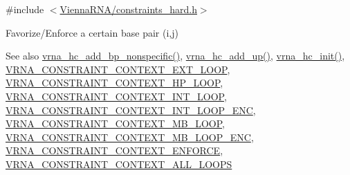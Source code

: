 {\ttfamily \#include $<$\hyperlink{constraints__hard_8h}{Vienna\+R\+N\+A/constraints\+\_\+hard.\+h}$>$}



Favorize/\+Enforce a certain base pair (i,j) 

\begin{DoxySeeAlso}{See also}
\hyperlink{group__hard__constraints_gadeb1083d0dc928e1e931065aae54ad82}{vrna\+\_\+hc\+\_\+add\+\_\+bp\+\_\+nonspecific()}, \hyperlink{group__hard__constraints_gaeb352e3e6ccd2b567bafa451365bb545}{vrna\+\_\+hc\+\_\+add\+\_\+up()}, \hyperlink{group__hard__constraints_ga36ff456c43bf920629cee5a236e4f0ff}{vrna\+\_\+hc\+\_\+init()}, \hyperlink{group__hard__constraints_ga9418eda62a5dec070896702c279d2548}{V\+R\+N\+A\+\_\+\+C\+O\+N\+S\+T\+R\+A\+I\+N\+T\+\_\+\+C\+O\+N\+T\+E\+X\+T\+\_\+\+E\+X\+T\+\_\+\+L\+O\+OP}, \hyperlink{group__hard__constraints_ga79203702b197b6b9d3b78eed40663eb1}{V\+R\+N\+A\+\_\+\+C\+O\+N\+S\+T\+R\+A\+I\+N\+T\+\_\+\+C\+O\+N\+T\+E\+X\+T\+\_\+\+H\+P\+\_\+\+L\+O\+OP}, \hyperlink{group__hard__constraints_ga21feeab3a9e5fa5a9e3d9ac0fcf5994f}{V\+R\+N\+A\+\_\+\+C\+O\+N\+S\+T\+R\+A\+I\+N\+T\+\_\+\+C\+O\+N\+T\+E\+X\+T\+\_\+\+I\+N\+T\+\_\+\+L\+O\+OP}, \hyperlink{group__hard__constraints_ga0536288e04ff6332ecdc23ca4705402b}{V\+R\+N\+A\+\_\+\+C\+O\+N\+S\+T\+R\+A\+I\+N\+T\+\_\+\+C\+O\+N\+T\+E\+X\+T\+\_\+\+I\+N\+T\+\_\+\+L\+O\+O\+P\+\_\+\+E\+NC}, \hyperlink{group__hard__constraints_ga456ecd2ff00056bb64da8dd4f61bbfc5}{V\+R\+N\+A\+\_\+\+C\+O\+N\+S\+T\+R\+A\+I\+N\+T\+\_\+\+C\+O\+N\+T\+E\+X\+T\+\_\+\+M\+B\+\_\+\+L\+O\+OP}, \hyperlink{group__hard__constraints_ga02a3d703ddbcfce393e4bbfcb9db7077}{V\+R\+N\+A\+\_\+\+C\+O\+N\+S\+T\+R\+A\+I\+N\+T\+\_\+\+C\+O\+N\+T\+E\+X\+T\+\_\+\+M\+B\+\_\+\+L\+O\+O\+P\+\_\+\+E\+NC}, \hyperlink{constraints__hard_8h_a1aa55f2c6347e670e003b1a765632dad}{V\+R\+N\+A\+\_\+\+C\+O\+N\+S\+T\+R\+A\+I\+N\+T\+\_\+\+C\+O\+N\+T\+E\+X\+T\+\_\+\+E\+N\+F\+O\+R\+CE}, \hyperlink{group__hard__constraints_ga886d9127c49bb982a4b67cd7581e8a5a}{V\+R\+N\+A\+\_\+\+C\+O\+N\+S\+T\+R\+A\+I\+N\+T\+\_\+\+C\+O\+N\+T\+E\+X\+T\+\_\+\+A\+L\+L\+\_\+\+L\+O\+O\+PS}
\end{DoxySeeAlso}

